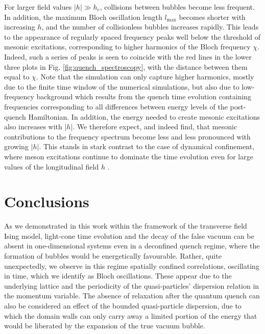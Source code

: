 \documentclass[amsmath,amssymb,11pt]{article}
\numberwithin{equation}{section}
\numberwithin{figure}{section}
\numberwithin{table}{section}
\begin{document}
{For larger field values $|h|\gg h_c$, collisions between bubbles become less frequent. In addition, the maximum Bloch oscillation length $l_\mathrm{max}$ becomes shorter with increasing $h$, and the number of collisionless bubbles increases rapidly. This leads to the appearance of regularly spaced frequency peaks well below the threshold of mesonic excitations, corresponding to higher harmonics of the Bloch frequency $\chi$. Indeed, such a series of peaks is seen to coincide with the red lines in the lower three plots in Fig. \ref{fig:quench_spectroscopy}, with the distance between them equal to $\chi$. Note that the simulation can only capture higher harmonics, mostly due to the finite time window of the numerical simulations, but also due to low-frequency background which results from the quench time evolution containing frequencies corresponding to all differences between energy levels of the post-quench Hamiltonian. In addition, the energy needed to create mesonic excitations also increases with $|h|$. We therefore expect, and indeed find, that mesonic contributions to the frequency spectrum become less and less pronounced with growing $|h|$.} This stands in stark contrast to the case of dynamical confinement, where meson excitations continue to dominate the time evolution even for large values of the longitudinal field $h$ \cite{2017NatPh..13..246K}.

\section{Conclusions}\label{sec:conclusions}

As we demonstrated in this work within the framework of the transverse field Ising model, light-cone time evolution and the decay of the false vacuum can be absent in one-dimensional systems even in a deconfined 
quench regime, where the formation of bubbles would be energetically 
favourable. Rather, quite unexpectedly, we observe in this regime spatially confined correlations, oscillating in time, which we identify as Bloch oscillations. These appear due to the  underlying lattice and the periodicity of the quasi-particles' dispersion relation in the momentum variable. The absence of relaxation after the quantum quench can also be considered an effect of the bounded quasi-particle dispersion, due to which the domain walls can only carry away a limited portion of the energy that would be liberated by the expansion of the true vacuum bubble.
\end{document}
